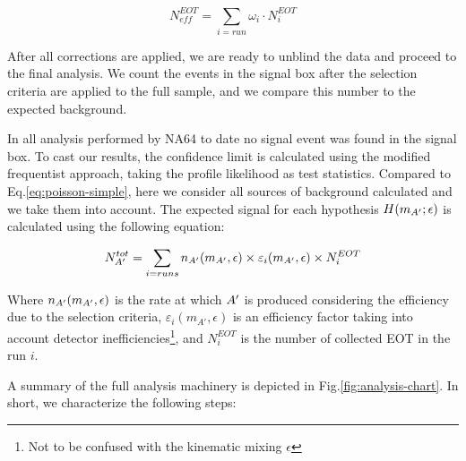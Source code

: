 \begin{equation}
  \label{eq:effective-eots}
  N_{eff}^{EOT} = \sum_{i=run} \omega_i \cdot N^{EOT}_i
\end{equation}

After all corrections are applied, we are ready to unblind the data and proceed to the final analysis. We count the events in the signal box after the selection criteria are applied to the full sample, and we compare this number to the expected background. 

In all analysis performed by NA64 to date \cite{Banerjee:2020fue,Banerjee:2019hmi,NA64:2019imj,na64-prd,Banerjee:2018vgk,Banerjee:2016tad} no signal event was found in the signal box. To cast our results, the confidence limit is calculated using the modified frequentist approach, taking the profile likelihood as test statistics\cite{JUNK1999435,Read_2002,Cowan:2010js}. Compared to Eq.\ref{eq:poisson-simple}, here we consider all sources of background calculated and we take them into account. The expected signal for each hypothesis $H(m_{A'};\epsilon)$ is calculated using the following equation:

\begin{equation}
  \label{eq:dm-expected-signal}
  N^{tot}_{A'} = \sum_{i=runs} n_{A'}(m_{A'},\epsilon) \times \varepsilon_i(m_{A'},\epsilon) \times N^{EOT}_i
\end{equation}

Where $n_{A'}(m_{A'},\epsilon)$ is the rate at which $A'$ is produced considering the efficiency due to the selection criteria, $\varepsilon_i(m_{A'},\epsilon)$ is an efficiency factor taking into account detector inefficiencies\footnote{Not to be confused with the kinematic mixing $\epsilon$}, and $N^{EOT}_i$ is the number of collected EOT in the run $i$.

A summary of the full analysis machinery is depicted in Fig.\ref{fig:analysis-chart}. In short, we characterize the following steps:

